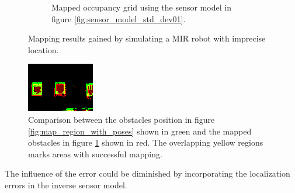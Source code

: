 \begin{figure}
\begin{subfigure}[t]{0.45\textwidth}
		\caption{Mapped occupancy grid using the sensor model in figure \ref{fig:sensor_model_std_dev01}.}
		\label{fig:elfes_ideal_with_poses}
	\end{subfigure}
	\caption{Mapping results gained by simulating a MIR robot with imprecise location.}
	\label{fig:simulated_location_error}
\end{figure}

\begin{figure}
	\centering
	\includegraphics[width=0.5\linewidth]{figures/static_mapping/elfes_ideal_no_decay}
	\caption{Comparison between the obstacles position in figure  \ref{fig:map_region_with_poses} shown in green and the mapped obstacles in figure \ref{fig:elfes_ideal_with_poses} shown in red. The overlapping yellow regions marks areas with successful mapping.}
	\label{fig:elfes_compare}
\end{figure}

The influence of the error could be diminished by incorporating the localization errors in the inverse sensor model.
